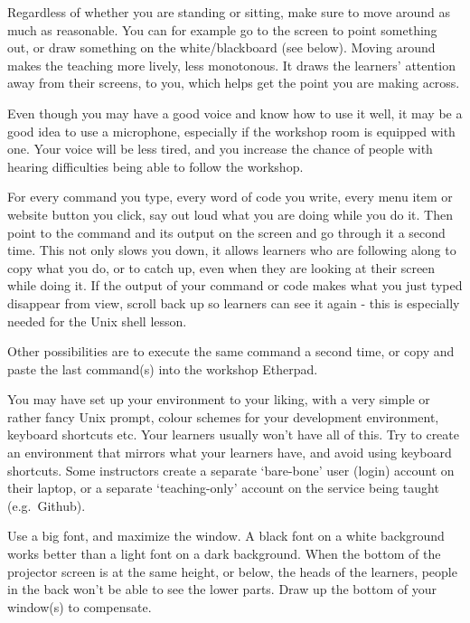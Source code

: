 Regardless of whether you are standing or sitting, make sure to move
around as much as reasonable. You can for example go to the screen to
point something out, or draw something on the white/blackboard (see
below). Moving around makes the teaching more lively, less monotonous.
It draws the learners' attention away from their screens, to you, which
helps get the point you are making across.

Even though you may have a good voice and know how to use it well, it
may be a good idea to use a microphone, especially if the workshop room
is equipped with one. Your voice will be less tired, and you increase
the chance of people with hearing difficulties being able to follow the
workshop.


For every command you type, every word of code you write, every menu
item or website button you click, say out loud what you are doing while
you do it. Then point to the command and its output on the screen and go
through it a second time. This not only slows you down, it allows
learners who are following along to copy what you do, or to catch up,
even when they are looking at their screen while doing it. If the output
of your command or code makes what you just typed disappear from view,
scroll back up so learners can see it again - this is especially needed
for the Unix shell lesson.

Other possibilities are to execute the same command a second time, or
copy and paste the last command(s) into the workshop Etherpad.


You may have set up your environment to your liking, with a very simple
or rather fancy Unix prompt, colour schemes for your development
environment, keyboard shortcuts etc. Your learners usually won't have
all of this. Try to create an environment that mirrors what your
learners have, and avoid using keyboard shortcuts. Some instructors
create a separate `bare-bone' user (login) account on their laptop, or a
separate `teaching-only' account on the service being taught
(e.g.~Github).


Use a big font, and maximize the window. A black font on a white
background works better than a light font on a dark background. When the
bottom of the projector screen is at the same height, or below, the
heads of the learners, people in the back won't be able to see the lower
parts. Draw up the bottom of your window(s) to compensate.

